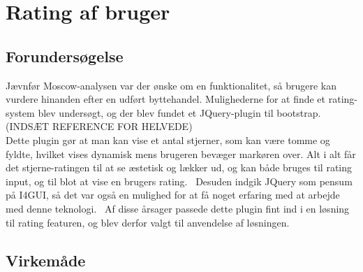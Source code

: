 \section{Rating af bruger}
\subsection{Forundersøgelse}
Jævnfør Moscow-analysen var der ønske om en funktionalitet, så brugere kan vurdere hinanden efter en udført byttehandel. Mulighederne for at finde et rating-system blev undersøgt, og der blev fundet et JQuery-plugin til bootstrap. (INDSÆT REFERENCE FOR HELVEDE) \\
Dette plugin gør at man kan vise et antal stjerner, som kan være tomme og fyldte, hvilket vises dynamisk mens brugeren bevæger markøren over. Alt i alt får det stjerne-ratingen til at se æstetisk og lækker ud, og kan både bruges til rating input, og til blot at vise en brugers rating. \
Desuden indgik JQuery som pensum på I4GUI, så det var også en mulighed for at få noget erfaring med at arbejde med denne teknologi. \ Af disse årsager passede dette plugin fint ind i en løsning til rating featuren, og blev derfor valgt til anvendelse af løsningen.
\subsection{Virkemåde}

